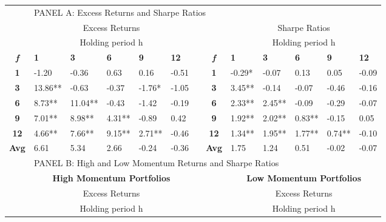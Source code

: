 \documentclass{article}
\begin{document}
\begin{table}[htpb!]
\begin{adjustwidth}{-1.5cm}{}
    \begin{tabular}{clllllrclllll}
          &       &       &       &       &       &       &       &       &       &       &       &  \\
    \midrule
          & \multicolumn{12}{l}{PANEL A: Excess Returns and Sharpe Ratios} \\
    \midrule
          & \multicolumn{5}{c}{Excess Returns}    &       &       & \multicolumn{5}{c}{Sharpe Ratios} \\
\cmidrule{2-6}\cmidrule{9-13}          & \multicolumn{5}{c}{Holding period h}  &       &       & \multicolumn{5}{c}{Holding period h} \\
    \textit{\textbf{f}} & \textbf{1} & \textbf{3} & \textbf{6} & \textbf{9} & \textbf{12} &       & \textit{\textbf{f}} & \textbf{1} & \textbf{3} & \textbf{6} & \textbf{9} & \textbf{12} \\
\cmidrule{2-6}\cmidrule{9-13}    \textbf{1} & -1.20 & -0.36 & 0.63  & 0.16  & -0.51 &       & \textbf{1} & -0.29* & -0.07 & 0.13  & 0.05  & -0.09 \\
    \textbf{3} & 13.86** & -0.63 & -0.37 & -1.76* & -1.05 &       & \textbf{3} & 3.45** & -0.14 & -0.07 & -0.46 & -0.16 \\
    \textbf{6} & 8.73** & 11.04** & -0.43 & -1.42 & -0.19 &       & \textbf{6} & 2.33** & 2.45** & -0.09 & -0.29 & -0.07 \\
    \textbf{9} & 7.01** & 8.98** & 4.31** & -0.89 & 0.42  &       & \textbf{9} & 1.92** & 2.02** & 0.83** & -0.15 & 0.05 \\
    \textbf{12} & 4.66** & 7.66** & 9.15** & 2.71** & -0.46 &       & \textbf{12} & 1.34** & 1.95** & 1.77** & 0.74** & -0.10 \\
\cmidrule{2-6}\cmidrule{9-13}    \textbf{Avg} & 6.61  & 5.34  & 2.66  & -0.24 & -0.36 &       & \textbf{Avg} & 1.75  & 1.24  & 0.51  & -0.02 & -0.07 \\
    \midrule
          & \multicolumn{12}{l}{PANEL B: High and Low Momentum Returns and Sharpe Ratios} \\
    \midrule
          & \multicolumn{5}{c}{\textbf{High Momentum Portfolios}} &       &       & \multicolumn{5}{c}{\textbf{Low Momentum Portfolios}} \\
    \midrule
          & \multicolumn{5}{c}{Excess Returns}    &       &       & \multicolumn{5}{c}{Excess Returns} \\
\cmidrule{2-6}\cmidrule{9-13}          & \multicolumn{5}{c}{Holding period h}  &       &       & \multicolumn{5}{c}{Holding period h} \\

\end{tabular}
\end{adjustwidth}
\end{table}
\end{document}
